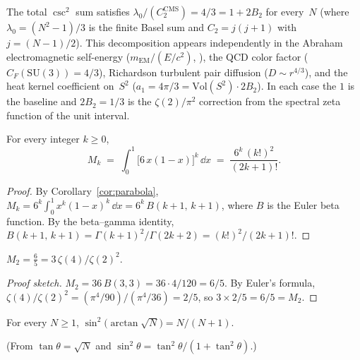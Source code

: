 \begin{proposition}[The $4/3 = 1 + 2B_2$ identity]
\label{prop:four-thirds}
The total $\csc^2$ sum satisfies
$\lambda_0/(C_2^{\mathrm{CMS}}) = 4/3 = 1 + 2B_2$
for every~$N$ (where $\lambda_0 = (N^2{-}1)/3$ is the
finite Basel sum and
$C_2 = j(j{+}1)$ with $j = (N{-}1)/2$).
This decomposition appears independently in the
Abraham electromagnetic self-energy ($m_{\mathrm{EM}}/(E/c^2)$,
\citeyear{Adams1974}),
the QCD color factor ($C_F(\mathrm{SU}(3)) = 4/3$),
Richardson turbulent pair diffusion ($D \sim r^{4/3}$),
and the heat kernel coefficient on~$S^2$
($a_1 = 4\pi/3 = \mathrm{Vol}(S^2) \cdot 2B_2$).
In each case the $1$ is the baseline and $2B_2 = 1/3$ is
the $\zeta(2)/\pi^2$ correction from the spectral zeta
function of the unit interval.
\end{proposition}

\begin{theorem}
\label{thm:moment-tower}
For every integer $k \ge 0$,
\begin{equation}
  M_k \;=\; \int_0^1 \bigl[6\,x(1{-}x)\bigr]^k\,\dd x
      \;=\; \frac{6^k\,(k!)^2}{(2k{+}1)!}.
\end{equation}
\end{theorem}
\begin{proof}
By Corollary~\ref{cor:parabola},
$M_k = 6^k \int_0^1 x^k(1{-}x)^k\,\dd x = 6^k\,B(k{+}1,\,k{+}1)$,
where $B$ is the Euler beta function.
By the beta--gamma identity,
$B(k{+}1,\,k{+}1) = \Gamma(k{+}1)^2/\Gamma(2k{+}2) = (k!)^2/(2k{+}1)!$.
\end{proof}

\begin{corollary}
\label{cor:zeta-bridge}
$M_2 = \tfrac{6}{5} = 3\,\zeta(4)/\zeta(2)^2$.
\end{corollary}
\begin{proof}[Proof sketch]
$M_2 = 36\,B(3,3) = 36 \cdot 4/120 = 6/5$.
By Euler's formula, $\zeta(4)/\zeta(2)^2
= (\pi^4/90)/(\pi^4/36) = 2/5$,
so $3 \times 2/5 = 6/5 = M_2$.
\end{proof}

\begin{corollary}
\label{cor:sin2-arctan}
For every $N \ge 1$,
$\sin^2\!\bigl(\arctan\sqrt{N}\bigr) = N/(N{+}1)$.
\end{corollary}
\noindent
(From $\tan\theta = \sqrt{N}$ and $\sin^2\theta
= \tan^2\theta/(1 + \tan^2\theta)$.)

